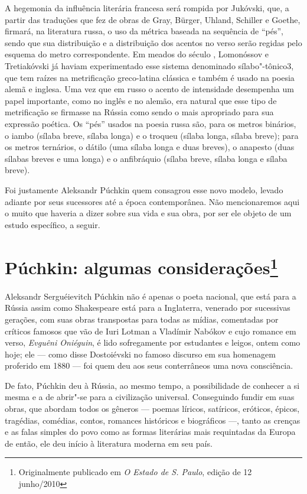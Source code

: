 A hegemonia da influência literária francesa será rompida por Jukóvski,
que, a partir das traduções que fez de obras de Gray, Bürger, Uhland,
Schiller e Goethe, firmará, na literatura russa, o uso da métrica baseada
na sequência de ``pés'', sendo que sua distribuição e a distribuição dos
acentos no verso serão regidas pelo esquema do metro correspondente. Em
meados do século , Lomonóssov e Tretiakóvski já haviam
experimentado esse sistema denomina­do sílabo"-tônico3, que tem raízes na
metrificação greco-latina clássica e tam­bém é usado na poesia alemã e
inglesa. Uma vez que em russo o acento de intensidade desempenha um
papel importante, como no inglês e no alemão, era natural que esse tipo
de metrificação se firmasse na Rússia como sendo o mais apropriado para
sua expressão poética. Os ``pés'' usados na poesia russa são, para os
metros binários, o iambo (sílaba breve, sílaba longa) e o troqueu
(sílaba longa, sílaba breve); para os metros ternários, o dátilo (uma
sílaba lon­ga e duas breves), o anapesto (duas sílabas breves e uma
longa) e o anfibráquio (sílaba breve, sílaba longa e sílaba breve).

Foi justamente Aleksandr Púchkin quem consagrou esse novo modelo, levado
adiante por seus sucessores até a época contemporânea. Não mencionaremos
aqui o muito que haveria a dizer sobre sua vida e sua obra, por ser ele
objeto de um estudo específico, a seguir.

\chapter{Púchkin: algumas considerações\footnote{Originalmente publicado em \emph{O Estado de S. Paulo}, edição de 12 junho/2010}}

Aleksandr Serguéievitch Púchkin não é apenas o poeta nacional, que está
para a Rússia assim como Shakespeare está para a Inglaterra, venerado
por sucessivas gerações, com suas obras transpostas para todas as
mídias, comentadas por críticos famosos que vão de Iuri Lotman a
Vladímir Nabókov e cujo romance em verso, \emph{Evguêni Oniéguin}, é lido
sofregamente por estudantes e leigos, ontem como hoje; ele --- como disse
Dostoiévski no famoso discurso em sua homenagem proferido em 1880 --- foi quem deu aos seus conterrâneos uma nova consciência.

De fato, Púchkin deu à Rússia, ao mesmo tempo, a possibilidade de
conhecer a si mesma e a de abrir"-se para a civilização universal.
Conseguindo fundir em suas obras, que abordam todos os gêneros --- poemas
líricos, satíricos, eróticos, épicos, tragédias, comédias, contos,
romances históricos e biográficos ---, tanto as crenças e as falas simples
do povo como as formas literárias mais requintadas da Europa de então,
ele deu início à literatura moderna em seu país.

